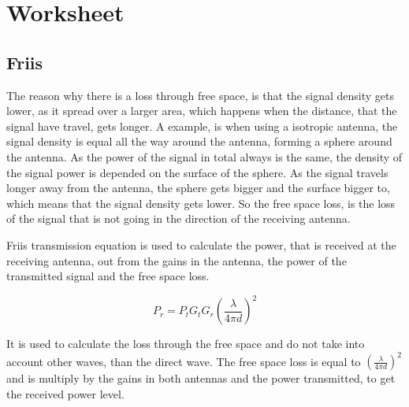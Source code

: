 \chapter{Worksheet}
\section{Friis}

The reason why there is a loss through free space, is that the signal density gets lower, as it spread over a larger area, which happens when the distance, that the signal have travel, gets longer. 
A example, is when using a isotropic antenna, the signal density is equal all the way around the antenna, forming a sphere around the antenna. As the power of the signal in total always is the same, the density of the signal power is depended on the surface of the sphere. As the signal travels longer away from the antenna, the sphere gets bigger and the surface bigger to, which means that the signal density gets lower. So the free space loss, is the loss of the signal that is not going in the direction of the receiving antenna.


Friis transmission equation is used to calculate the power, that is received at the receiving antenna, out from the gains in the antenna, the power of the transmitted signal and the free space loss. 

\begin{equation}
P_r = P_t G_t G_r (\frac{\lambda}{4 \pi d})^2
\end{equation}
\begin{where}
\end{where}

It is used to calculate the loss through the free space and do not take into account other waves, than the direct wave. The free space loss is equal to $(\frac{\lambda}{4 \pi d})^2$ and is multiply by the gains in both antennas and the power transmitted, to get the received power level.



